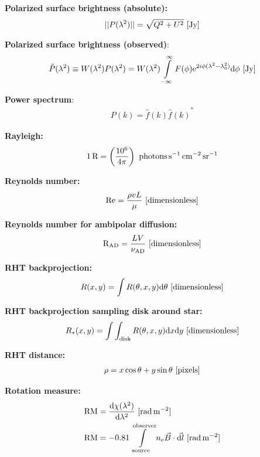 \documentclass[a4paper,10pt]{article}
\begin{document}
{\noindent}\textbf{Polarized surface brightness (absolute):}
\begin{align*}
\lvert\lvert P(\lambda^2) \rvert\rvert = \sqrt{Q^2+U^2} ~ [\rm Jy]
\end{align*}

{\noindent}\textbf{Polarized surface brightness (observed)}:
\begin{align*}
\tilde{P}(\lambda^2) \equiv W(\lambda^2)P(\lambda^2) = W(\lambda^2) \int\limits_{-\infty}^\infty F(\phi)\mathrm{e}^{2i\phi(\lambda^2-\lambda_0^2)}\mathrm{d}\phi ~ [\rm Jy]
\end{align*}

{\noindent}\textbf{Power spectrum}:
\begin{align*}
    P(k) = \hat{f}(k){\hat{f}(k)}^*
\end{align*}

{\noindent}\textbf{Rayleigh:}
\begin{align*}
    1\,{\rm R} = \left(\frac{10^6}{4\pi}\right) ~ {\rm photons\,s^{-1}\,cm^{-2}\,sr^{-1}}
\end{align*}

{\noindent}\textbf{Reynolds number:}
\begin{align*}
    {\rm Re} = \frac{\rho vL}{\mu} ~ [{\rm dimensionless}]
\end{align*}

{\noindent}\textbf{Reynolds number for ambipolar diffusion:}
\begin{align*}
    {\rm R}_\mathrm{\rm AD} = \dfrac{LV}{\nu_\mathrm{AD}} ~ [{\rm dimensionless}]
\end{align*}

{\noindent}\textbf{RHT backprojection:}
\begin{align*}
    R(x,y) = \int R(\theta,x,y)\mathrm{d}\theta ~ [{\rm dimensionless}]
\end{align*}

{\noindent}\textbf{RHT backprojection sampling disk around star:}
\begin{align*}
    R_*(x,y) = \int\int_\mathrm{disk} R(\theta,x,y)\mathrm{d}x\mathrm{d}y ~ [{\rm dimensionless}]
\end{align*}

{\noindent}\textbf{RHT distance:}
\begin{align*}
    \rho = x\cos\theta+y\sin\theta ~ [{\rm pixels}]
\end{align*}

{\noindent}\textbf{Rotation measure:}
\begin{align*}
{\rm RM} &= \dfrac{\mathrm{d}\chi(\lambda^2)}{\mathrm{d}\lambda^2} ~ [{\rm rad\,m^{-2}}] \\
\mathrm{RM}& = -0.81 \int\limits_\mathrm{source}^\mathrm{observer} n_e \vec{B}\cdot\vec{{\rm d}l} ~ [{\rm rad\,m^{-2}}]
\end{align*}
\end{document}
